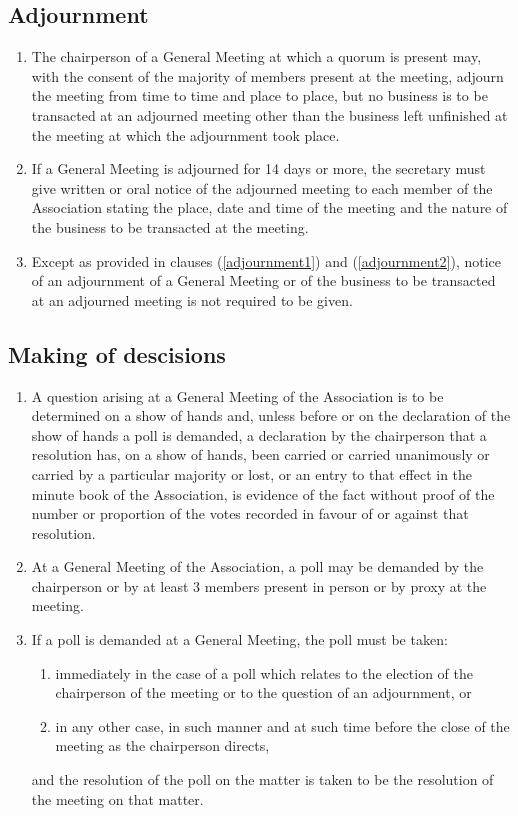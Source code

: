 \subsection{Adjournment}
\begin{enumerate}
  \item\label{adjournment1} The chairperson of a General Meeting at which a quorum is present may, with the consent of the majority of members present at the meeting, adjourn the meeting from time to time and place to place, but no business is to be transacted at an adjourned meeting other than the business left unfinished at the meeting at which the adjournment took place.
  \item\label{adjournment2} If a General Meeting is adjourned for 14 days or more, the secretary must give written or oral notice of the adjourned meeting to each member of the Association stating the place, date and time of the meeting and the nature of the business to be transacted at the meeting.
  \item Except as provided in clauses (\ref{adjournment1}) and (\ref{adjournment2}), notice of an adjournment of a General Meeting or of the business to be transacted at an adjourned meeting is not required to be given.
\end{enumerate}

\subsection{Making of descisions}
\begin{enumerate}
  \item A question arising at a General Meeting of the Association is to be determined on a show of hands and, unless before or on the declaration of the show of hands a poll is demanded, a declaration by the chairperson that a resolution has, on a show of hands, been carried or carried unanimously or carried by a particular majority or lost, or an entry to that effect in the minute book of the Association, is evidence of the fact without proof of the number or proportion of the votes recorded in favour of or against that resolution.
  \item At a General Meeting of the Association, a poll may be demanded by the chairperson or by at least 3 members present in person or by proxy at the meeting.
  \item If a poll is demanded at a General Meeting, the poll must be taken:
  \begin{enumerate}
    \item immediately in the case of a poll which relates to the election of the chairperson of the meeting or to the question of an adjournment, or
    \item in any other case, in such manner and at such time before the close of the meeting as the chairperson directs,
  \end{enumerate}
  and the resolution of the poll on the matter is taken to be the resolution of the meeting on that matter.
\end{enumerate}

